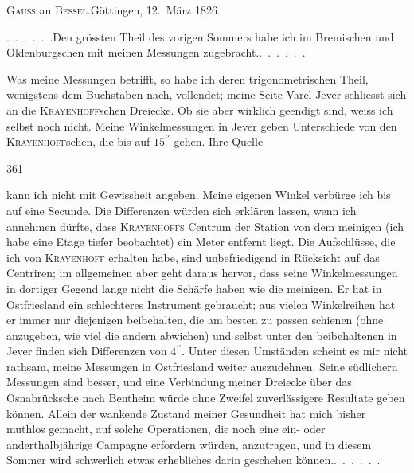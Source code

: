 \begin{center}
\textsc{Gauss} an \textsc{Bessel}.\quad Göttingen, 12.~März 1826.
\end{center}

\par\noindent\hspace*{\parindent}.\ .\ .\ .\ .\ .\quad Den grössten Theil des vorigen Sommers habe ich im Bremischen und Oldenburgschen mit meinen Messungen zugebracht.\quad.\ .\ .\ .\ .\ .

\par\noindent\hspace*{\parindent}Was meine Messungen betrifft, so habe ich deren trigonometrischen Theil, wenigstens dem Buchstaben nach, vollendet; meine Seite Varel-Jever schliesst sich an die \textsc{Krayenhoff}schen Dreiecke.
Ob sie aber wirklich geendigt sind, weiss ich selbst noch nicht.
Meine Winkelmessungen in Jever geben  Unterschiede von den \textsc{Krayenhoff}schen, die bis auf \(15^{\prime\prime}\) gehen.
Ihre Quelle
\par\clearpage
{}\hfill361\par\medskip
\noindent kann ich nicht mit Gewissheit angeben.
Meine eigenen Winkel verbürge ich bis auf eine Secunde.
Die Differenzen würden sich erklären lassen, wenn ich annehmen dürfte, dass \textsc{Krayenhoffs} Centrum der Station von dem meinigen (ich habe eine Etage tiefer beobachtet) ein Meter entfernt liegt.
Die Aufschlüsse, die ich von \textsc{Krayenhoff} erhalten habe, sind unbefriedigend in Rücksicht auf das Centriren; im allgemeinen aber geht daraus hervor, dass seine Winkelmessungen in dortiger Gegend lange nicht die Schärfe haben wie die meinigen.
Er hat in Ostfriesland ein schlechteres Instrument gebraucht; aus vielen Winkelreihen hat er immer nur diejenigen beibehalten, die am besten zu passen schienen (ohne anzugeben, wie viel die andern abwichen) und selbst unter den beibehaltenen in Jever finden sich Differenzen von \(4^{\prime\prime}\).
Unter diesen Umständen scheint es mir nicht rathsam, meine Messungen in Ostfriesland weiter auszudehnen.
Seine südlichern Messungen sind besser, und eine Verbindung meiner Dreiecke über das Osnabrücksche nach Bentheim würde ohne Zweifel zuverlässigere Resultate geben können.
Allein der wankende Zustand meiner Gesundheit hat mich bisher muthlos gemacht, auf solche Operationen, die noch eine ein- oder anderthalbjährige Campagne erfordern würden, anzutragen, und in diesem Sommer wird schwerlich etwas erhebliches darin geschehen können.\quad.\ .\ .\ .\ .\ .

